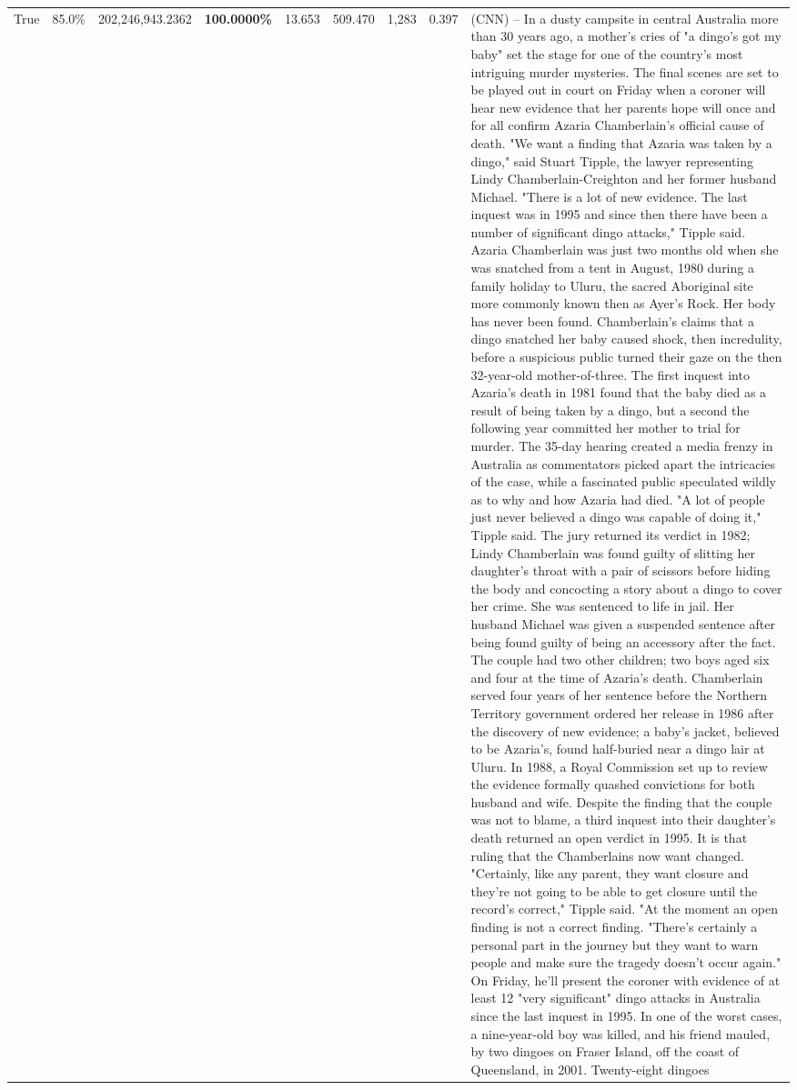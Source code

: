 \begin{table}[H]
\begin{tabular}{lllrlllll}
True & 85.0\% & 202,246,943.2362 & \bfseries \color{red} 100.0000\% & 13.653 & 509.470 & 1,283 & 0.397 & (CNN) -- In a dusty campsite in central Australia more than 30 years ago, a mother's cries of "a dingo's got my baby" set the stage for one of the country's most intriguing murder mysteries. The final scenes are set to be played out in court on Friday when a coroner will hear new evidence that her parents hope will once and for all confirm Azaria Chamberlain's official cause of death. "We want a finding that Azaria was taken by a dingo," said Stuart Tipple, the lawyer representing Lindy Chamberlain-Creighton and her former husband Michael. "There is a lot of new evidence. The last inquest was in 1995 and since then there have been a number of significant dingo attacks," Tipple said. Azaria Chamberlain was just two months old when she was snatched from a tent in August, 1980 during a family holiday to Uluru, the sacred Aboriginal site more commonly known then as Ayer's Rock. Her body has never been found. Chamberlain's claims that a dingo snatched her baby caused shock, then incredulity, before a suspicious public turned their gaze on the then 32-year-old mother-of-three. The first inquest into Azaria's death in 1981 found that the baby died as a result of being taken by a dingo, but a second the following year committed her mother to trial for murder. The 35-day hearing created a media frenzy in Australia as commentators picked apart the intricacies of the case, while a fascinated public speculated wildly as to why and how Azaria had died. "A lot of people just never believed a dingo was capable of doing it," Tipple said. The jury returned its verdict in 1982; Lindy Chamberlain was found guilty of slitting her daughter's throat with a pair of scissors before hiding the body and concocting a story about a dingo to cover her crime. She was sentenced to life in jail. Her husband Michael was given a suspended sentence after being found guilty of being an accessory after the fact. The couple had two other children; two boys aged six and four at the time of Azaria's death. Chamberlain served four years of her sentence before the Northern Territory government ordered her release in 1986 after the discovery of new evidence; a baby's jacket, believed to be Azaria's, found half-buried near a dingo lair at Uluru. In 1988, a Royal Commission set up to review the evidence formally quashed convictions for both husband and wife. Despite the finding that the couple was not to blame, a third inquest into their daughter's death returned an open verdict in 1995. It is that ruling that the Chamberlains now want changed. "Certainly, like any parent, they want closure and they're not going to be able to get closure until the record's correct," Tipple said. "At the moment an open finding is not a correct finding. "There's certainly a personal part in the journey but they want to warn people and make sure the tragedy doesn't occur again." On Friday, he'll present the coroner with evidence of at least 12 "very significant" dingo attacks in Australia since the last inquest in 1995. In one of the worst cases, a nine-year-old boy was killed, and his friend mauled, by two dingoes on Fraser Island, off the coast of Queensland, in 2001. Twenty-eight dingoes 
\end{tabular}
\end{table}
